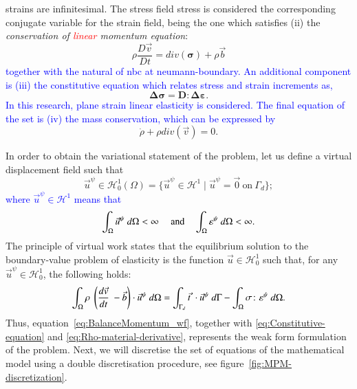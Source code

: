 \documentclass[preprint,12pt,a4paper]{elsarticle}
\newcommand{\tens}[1]{
  \ensuremath{\mathbf{{#1}}}
}
\newcommand{\Div}[1]{
  \ensuremath{div({#1})}
}
\newcommand{\Integral}[2]{
  \IfStrEqCase{#1}{
    {2}{\ensuremath{\int_{\Gamma_d}{#2}\ d\Gamma}}
    {3}{\ensuremath{\int_{\Omega}{#2}\ d\Omega}}
  }
}
\begin{document}
strains are infinitesimal. The stress field \gls{stress} is considered the corresponding
conjugate variable for the strain field, being the one which
satisfies (ii) the \textit{conservation of \textcolor{red}{linear} momentum equation}:
\begin{equation}
  \label{eq:Balance-momentum}
\rho \frac{D\vec{v}}{Dt} = \Div{\tens{\sigma}} + \rho \vec{b}
\end{equation}
\textcolor{blue}{together with the natural of \acrfull{nbc} at \gls{neumann-boundary}. An additional component is (iii) the constitutive equation which relates stress and strain increments as,}
{\color{red}
\begin{equation}
  \label{eq:Constitutive-equation}
\tens{\Delta \sigma} = \tens{D} \colon \tens{\Delta \varepsilon}.
\end{equation}
}
\textcolor{blue}{
In this research, plane strain linear elasticity is considered. The final equation of the set is (iv) the mass conservation, which can be expressed by} 
\begin{equation}
  \label{eq:Rho-material-derivative}
    \dot{\rho} + \rho \Div{\vec{v}} = 0.
\end{equation}

In order to obtain the variational statement of the problem, let us define a
virtual displacement field such that
\begin{equation}
  \label{eq:Hilbert-space}
  \vec{u}^{\psi} \in \mathcal{H}^1_0(\Omega) = \{ \vec{u}^{\psi} \in
  \mathcal{H}^1 \mid \vec{u}^{\psi} = \vec{0}\ \text{on}\ \Gamma_d \};
\end{equation}
\textcolor{blue}{where $\vec{u}^{\psi} \in \mathcal{H}^1$ means that}
\begin{equation}
  \label{eq:cauchy-secuence}
  \Integral{3}{\vec{u}^{\psi}} < \infty\ \quad\text{and}\quad
  \Integral{3}{\tens{\varepsilon}^{\psi}} < \infty.
\end{equation}
The principle of virtual work states that the equilibrium solution to
the boundary-value problem of elasticity is the function $\vec{u} \in
\mathcal{H}^1_0$ such that, for any $\vec{u}^{\psi} \in
\mathcal{H}^1_0$,
the following holds:
\begin{equation}
  \label{eq:BalanceMomentum_wf}
  \Integral{3}{\rho\ \left( \frac{d\vec{v}}{dt}\ - \vec{b} \right) \cdot \vec{u}^{\psi}} =
  \Integral{2}{\vec{t}\ \cdot \vec{u}^{\psi}} - \Integral{3}{\tens{\sigma} \colon
   \tens{\varepsilon}^{\psi}}.
\end{equation}
Thus, equation~\eqref{eq:BalanceMomentum_wf}, together with
\eqref{eq:Constitutive-equation} and
\eqref{eq:Rho-material-derivative}, represents the weak form
formulation of the problem. Next, we will discretise the set of equations of the mathematical model using a double discretisation procedure, see figure~\ref{fig:MPM-discretization}.\\
\end{document}
